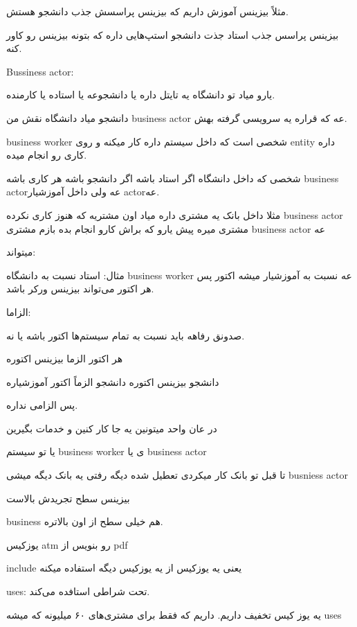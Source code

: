 مثلاً بیزینس آموزش داریم که بیزینس پراسسش جذب دانشجو هستش. 

بیزینس پراسس جذب استاد
جذت دانشجو
استپ‌هایی داره که بتونه بیزینس رو کاور کنه.

Bussiness actor: 

یارو میاد تو دانشگاه یه تایتل داره یا دانشجوعه یا استاده یا کارمنده.

دانشجو میاد دانشگاه نقش من business actor عه که قراره یه سرویسی گرفته بهش.

business worker شخصی است که داخل سیستم داره کار میکنه و روی entity داره کاری رو
انجام میده.

شخصی که داخل دانشگاه اگر استاد باشه اگر دانشجو باشه هر کاری باشه business actorعه 
ولی داخل آموزشیار actorعه.

مثلا داخل بانک یه مشتری داره میاد
اون مشتریه که هنوز کاری نکرده business actor
مشتری میره پیش یارو که براش کارو انجام بده بازم مشتری business actor عه



میتواند:

مثال: استاد نسبت به دانشگاه business worker عه نسبت به آموزشیار میشه اکتور
پس هر اکتور می‌تواند بیزینس ورکر باشد.

الزاما:

صدونق رفاهه باید نسبت به تمام سیستم‌ها اکتور باشه یا نه.

هر اکتور الزما بیزینس اکتوره

دانشجو بیزینس اکتوره
دانشجو الزماً اکتور آموزشیاره

پس الزامی نداره.

در عان واحد میتونین یه جا کار کنین و خدمات بگیرین

یا تو سیستم business worker ی یا business actor

تا قبل تو بانک کار میکردی
تعطیل شده دیگه رفتی یه بانک دیگه میشی busniess actor

بیزینس سطح تجریدش بالاست

business هم خیلی سطح از اون بالاتره.

یوزکیس atm رو بنویس از pdf

include یعنی یه یوزکیس از یه یوزکیس دیگه استفاده میکنه

uses: تحت شراطی استافده می‌کند.

یه یوز کیس تخفیف داریم. داریم که فقط برای مشتری‌های ۶۰ میلیونه که میشه uses

